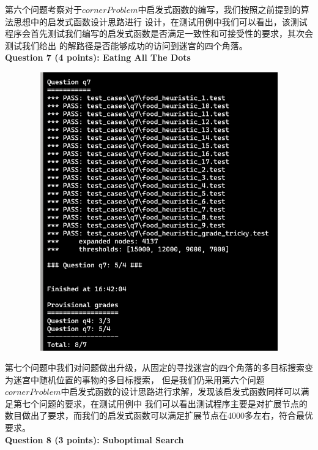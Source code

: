 \documentclass[a4paper,12pt,UTF8]{article}
\begin{document}
\begin{flushleft}
{\begin{figure}[h]
    \end{figure}
    \normalsize{
        \hspace{1cm}第六个问题考察对于$cornerProblem$中启发式函数的编写，我们按照之前提到的算法思想中的启发式函数设计思路进行
        设计，在测试用例中我们可以看出，该测试程序会首先测试我们编写的启发式函数是否满足一致性和可接受性的要求，其次会测试我们给出
        的解路径是否能够成功的访问到迷宫的四个角落。\\
    }
    \newpage
    \large{
        \hspace{1cm}\textbf{
            Question 7 (4 points): Eating All The Dots\\
        }
    }
    \begin{figure}[h]
        \centering
        \includegraphics[width=12cm,height=12cm]{7.png}
    \end{figure}
    \normalsize{
        \hspace{1cm}第七个问题中我们对问题做出升级，从固定的寻找迷宫的四个角落的多目标搜索变为迷宫中随机位置的事物的多目标搜索，
        但是我们仍采用第六个问题$cornerProblem$中启发式函数的设计思路进行求解，发现该启发式函数同样可以满足第七个问题的要求，在测试用例中
        我们可以看出测试程序主要是对扩展节点的数目做出了要求，而我们的启发式函数可以满足扩展节点在4000多左右，符合最优要求。\\
    }
    \newpage
    \large{
        \hspace{1cm}\textbf{
            Question 8 (3 points): Suboptimal Search\\
}}}
\end{flushleft}
\end{document}
